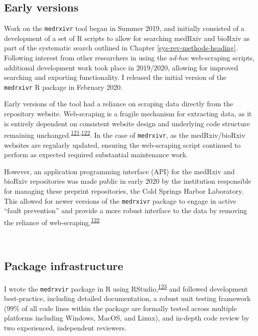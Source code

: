 \documentclass[a4paper, twoside]{templates/ociamthesis}
\begin{document}
\hypertarget{early-versions}{%
\subsection{Early versions}\label{early-versions}}

Work on the \texttt{medrxivr} tool began in Summer 2019, and initially consisted of a development of a set of R scripts to allow for searching medRxiv and bioRxiv as part of the systematic search outlined in Chapter \ref{sys-rev-methods-heading}. Following interest from other researchers in using the \emph{ad-hoc} web-scraping scripts, additional development work took place in 2019/2020, allowing for improved searching and exporting functionality. I released the initial version of the \texttt{medrxivr} R package in February 2020.

Early versions of the tool had a reliance on scraping data directly from the repository website. Web-scraping is a fragile mechanism for extracting data, as it is entirely dependent on consistent website design and underlying code structure remaining unchanged.\textsuperscript{\protect\hyperlink{ref-shaw2002}{121},\protect\hyperlink{ref-laprie1992}{122}}. In the case of \texttt{medrxivr}, as the medRxiv/bioRxiv websites are regularly updated, ensuring the web-scraping script continued to perform as expected required substantial maintenance work.

However, an application programming interface (API) for the medRxiv and bioRxiv repositories was made public in early 2020 by the institution responsible for managing these preprint repositories, the Cold Springs Harbor Laboratory. This allowed for newer versions of the \texttt{medrxivr} package to engage in active ``fault prevention'' and provide a more robust interface to the data by removing the reliance of web-scraping.\textsuperscript{\protect\hyperlink{ref-laprie1992}{122}}

~

\hypertarget{package-infrastructure}{%
\subsection{Package infrastructure}\label{package-infrastructure}}

I wrote the \texttt{medrxvir} package in R using RStudio,\textsuperscript{\protect\hyperlink{ref-rcoreteam2019}{123}} and followed development best-practice, including detailed documentation, a robust unit testing framework (99\% of all code lines within the package are formally tested across multiple platforms including Windows, MacOS, and Linux), and in-depth code review by two experienced, independent reviewers.
\end{document}
